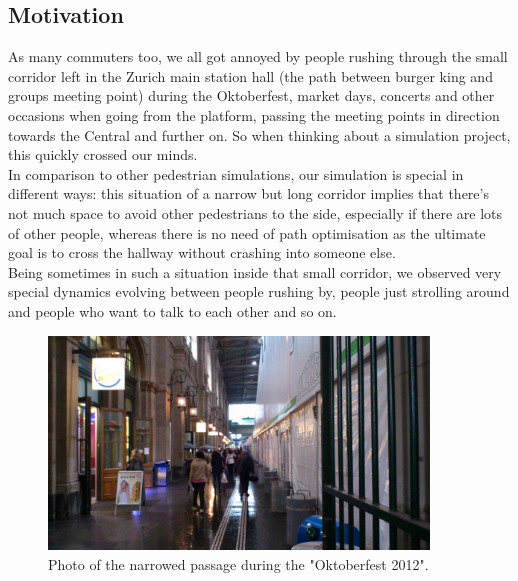 

\subsection{Motivation}
As many commuters too, we all got annoyed by people rushing through the small corridor left in the Zurich main station hall (the path between burger king and groups meeting point) during the Oktoberfest, market days, concerts and other occasions when going from the platform, passing the meeting points in direction towards the Central and further on. So when thinking about a simulation project, this quickly crossed our minds.\\
In comparison to other pedestrian simulations, our simulation is special in different ways: this situation of a narrow but long corridor implies that there's not much space to avoid other pedestrians to the side, especially if there are lots of other people, whereas there is no need of path optimisation as the ultimate goal is to cross the hallway without crashing into someone else.\\
Being sometimes in such a situation inside that small corridor, we observed very special dynamics evolving between people rushing by, people just strolling around and people who want to talk to each other and so on.

\begin{figure}[h!]
	\centering
		\includegraphics[width=0.90\textwidth]{pictures/oktoberfest2}
	\caption{Photo of the narrowed passage during the "Oktoberfest 2012".}
	\label{fig:oktoberfest2}
\end{figure}

